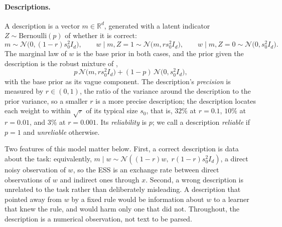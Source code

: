 \documentclass[10pt]{article}
\newcommand{\R}{\mathbb{R}}
\begin{document}
\paragraph{Descriptions.}
A description is a vector $m \in \R^d$, generated with a latent indicator $Z \sim \mathrm{Bernoulli}(p)$ of whether it is correct:
\begin{equation}\label{eq:description}
m \sim \mathcal{N}\big(0, (1-r)s_0^2 I_d\big), \qquad
w \mid m, Z=1 \sim \mathcal{N}\big(m, r s_0^2 I_d\big), \qquad
w \mid m, Z=0 \sim \mathcal{N}\big(0, s_0^2 I_d\big).
\end{equation}
The marginal law of $w$ is the base prior in both cases, and the prior given the description is the robust mixture of \citet{schmidli2014},
\begin{equation}\label{eq:mixture}
p\,\mathcal{N}\big(m, r s_0^2 I_d\big) + (1-p)\,\mathcal{N}\big(0, s_0^2 I_d\big),
\end{equation}
with the base prior as its vague component. The description's \emph{precision} is measured by $r \in (0,1)$, the ratio of the variance around the description to the prior variance, so a smaller $r$ is a more precise description; the description locates each weight to within $\sqrt{r}$ of its typical size $s_0$, that is, $32\%$ at $r = 0.1$, $10\%$ at $r = 0.01$, and $3\%$ at $r = 0.001$. Its \emph{reliability} is $p$; we call a description \emph{reliable} if $p = 1$ and \emph{unreliable} otherwise.

Two features of this model matter below. First, a correct description is data about the task: equivalently, $m \mid w \sim \mathcal{N}((1-r)w,\; r(1-r)s_0^2 I_d)$, a direct noisy observation of $w$, so the ESS is an exchange rate between direct observations of $w$ and indirect ones through $x$. Second, a wrong description is unrelated to the task rather than deliberately misleading. A description that pointed away from $w$ by a fixed rule would be information about $w$ to a learner that knew the rule, and would harm only one that did not. Throughout, the description is a numerical observation, not text to be parsed.
\end{document}
